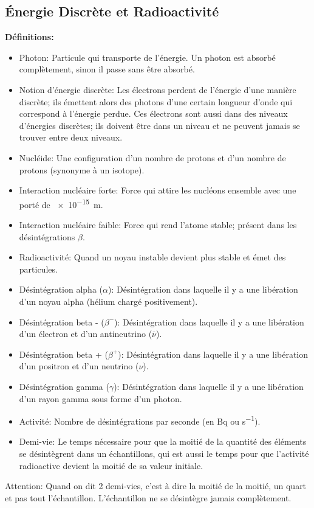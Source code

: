 \documentclass[french, a4paper, 12pt]{article}
\begin{document}
\subsection{Énergie Discrète et Radioactivité}
\textbf{Définitions:}
\begin{itemize}
\item Photon: Particule qui transporte de l'énergie. Un photon est absorbé complètement, sinon il passe sans être absorbé.
\item Notion d'énergie discrète: Les électrons perdent de l'énergie d'une manière discrète; ils émettent alors des photons d'une certain longueur d'onde qui correspond à l'énergie perdue. Ces électrons sont aussi dans des niveaux d'énergies discrètes; ils doivent être dans un niveau et ne peuvent jamais se trouver entre deux niveaux.
\item Nucléide: Une configuration d'un nombre de protons et d'un nombre de protons (synonyme à un isotope).
\item Interaction nucléaire forte: Force qui attire les nucléons ensemble avec une porté de \SI{e-15}{m}.
\item Interaction nucléaire faible: Force qui rend l'atome stable; présent dans les désintégrations $\beta$.
\item Radioactivité: Quand un noyau instable devient plus stable et émet des particules.
\item Désintégration alpha ($\alpha$): Désintégration dans laquelle il y a une libération d'un noyau alpha (hélium chargé positivement).
\item Désintégration beta - ($\beta ^-$): Désintégration dans laquelle il y a une libération d'un électron et d'un antineutrino ($\overline{\nu}$).
\item Désintégration beta + ($\beta ^+$): Désintégration dans laquelle il y a une libération d'un positron et d'un neutrino ($\nu$).
\item Désintégration gamma ($\gamma$): Désintégration dans laquelle il y a une libération d'un rayon gamma sous forme d'un photon.
\item Activité: Nombre de désintégrations par seconde (en \si{Bq} ou \si{s^{-1}}).
\item Demi-vie: Le temps nécessaire pour que la moitié de la quantité des éléments se désintègrent dans un échantillons, qui est aussi le temps pour que l'activité radioactive devient la moitié de sa valeur initiale.
\end{itemize}
Attention: Quand on dit 2 demi-vies, c'est à dire la moitié de la moitié, un quart et pas tout l'échantillon. L'échantillon ne se désintègre jamais complètement.
\end{document}
